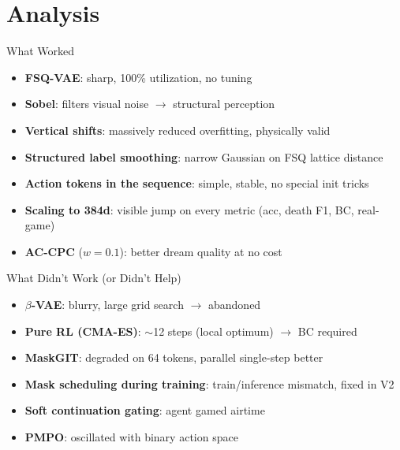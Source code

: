 \documentclass[aspectratio=169]{beamer}
\begin{document}
\section{Analysis}

\begin{frame}{What Worked}
  \vspace{0.5em}
  \begin{itemize}
    \item \textbf{FSQ-VAE}: sharp, 100\% utilization, no tuning
    \item \textbf{Sobel}: filters visual noise $\to$ structural perception
    \item \textbf{Vertical shifts}: massively reduced overfitting, physically valid
    \item \textbf{Structured label smoothing}: narrow Gaussian on FSQ lattice distance
    \item \textbf{Action tokens in the sequence}: simple, stable, no special init tricks
    \item \textbf{Scaling to 384d}: visible jump on every metric (acc, death F1, BC, real-game)
    \item \textbf{AC-CPC} ($w=0.1$): better dream quality at no cost
  \end{itemize}
\end{frame}

\begin{frame}{What Didn't Work (or Didn't Help)}
  \vspace{0.5em}
  \begin{itemize}
    \item \textbf{$\beta$-VAE}: blurry, large grid search $\to$ abandoned
    \item \textbf{Pure RL (CMA-ES)}: $\sim$12 steps (local optimum) $\to$ BC required
    \item \textbf{MaskGIT}: degraded on 64 tokens, parallel single-step better
    \item \textbf{Mask scheduling during training}: train/inference mismatch, fixed in V2
    \item \textbf{Soft continuation gating}: agent gamed airtime
    \item \textbf{PMPO}: oscillated with binary action space
  \end{itemize}
\end{frame}
\end{document}

